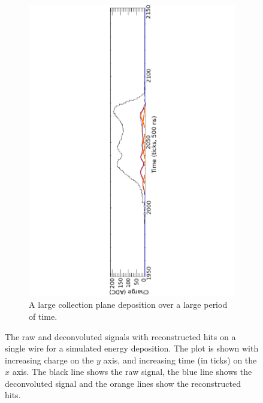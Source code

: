 \begin{figure}[h]
\begin{subfigure}{0.95\textwidth}
    \includegraphics[width=\textwidth]{Complex}
    \caption{A large collection plane deposition over a large period of time.}
    \label{fig:LotsOfHits_Big}
  \end{subfigure}
  \caption[Reconstructed hits from a simulated energy deposition]{The raw and deconvoluted signals with reconstructed hits on a single wire for a simulated energy deposition. The plot is shown with increasing charge on the $y$ axis, and increasing time (in ticks) on the $x$ axis. The black line shows the raw signal, the blue line shows the deconvoluted signal and the orange lines show the reconstructed hits.}
  \label{fig:LotsOfHits}
\end{figure}

